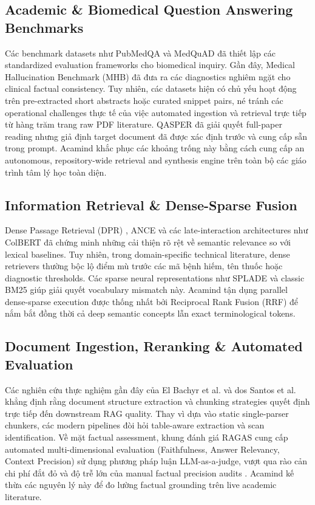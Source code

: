 \documentclass[10pt]{SPIIRAS_Proceedings}
\begin{document}
\subsection{Academic \& Biomedical Question Answering Benchmarks}
Các benchmark datasets như PubMedQA \cite{jin2019pubmedqa} và MedQuAD \cite{abacha2019question} đã thiết lập các standardized evaluation frameworks cho biomedical inquiry. Gần đây, Medical Hallucination Benchmark (MHB) \cite{lu2026mhb} đã đưa ra các diagnostics nghiêm ngặt cho clinical factual consistency. Tuy nhiên, các datasets hiện có chủ yếu hoạt động trên pre-extracted short abstracts hoặc curated snippet pairs, né tránh các operational challenges thực tế của việc automated ingestion và retrieval trực tiếp từ hàng trăm trang raw PDF literature. QASPER \cite{dasigi2021dataset} đã giải quyết full-paper reading nhưng giả định target document đã được xác định trước và cung cấp sẵn trong prompt. Acamind khắc phục các khoảng trống này bằng cách cung cấp an autonomous, repository-wide retrieval and synthesis engine trên toàn bộ các giáo trình tâm lý học toàn diện.

\subsection{Information Retrieval \& Dense-Sparse Fusion}
Dense Passage Retrieval (DPR) \cite{karpukhin2020dense}, ANCE \cite{xiong2021approximate} và các late-interaction architectures như ColBERT \cite{khattab2020colbert} đã chứng minh những cải thiện rõ rệt về semantic relevance so với lexical baselines. Tuy nhiên, trong domain-specific technical literature, dense retrievers thường bộc lộ điểm mù trước các mã bệnh hiếm, tên thuốc hoặc diagnostic thresholds. Các sparse neural representations như SPLADE \cite{formal2021splade} và classic BM25 giúp giải quyết vocabulary mismatch này. Acamind tận dụng parallel dense-sparse execution được thống nhất bởi Reciprocal Rank Fusion (RRF) \cite{cormack2009reciprocal} để nắm bắt đồng thời cả deep semantic concepts lẫn exact terminological tokens.

\subsection{Document Ingestion, Reranking \& Automated Evaluation}
Các nghiên cứu thực nghiệm gần đây của El Bachyr et al. \cite{elbachyr2024empirical} và dos Santos et al. \cite{santos2026pdf} khẳng định rằng document structure extraction và chunking strategies quyết định trực tiếp đến downstream RAG quality. Thay vì dựa vào static single-parser chunkers, các modern pipelines đòi hỏi table-aware extraction và scan identification. Về mặt factual assessment, khung đánh giá RAGAS \cite{es2024ragas} cung cấp automated multi-dimensional evaluation (Faithfulness, Answer Relevancy, Context Precision) sử dụng phương pháp luận LLM-as-a-judge, vượt qua rào cản chi phí đắt đỏ và độ trễ lớn của manual factual precision audits \cite{min2023factscore}. Acamind kế thừa các nguyên lý này để đo lường factual grounding trên live academic literature.
\end{document}
